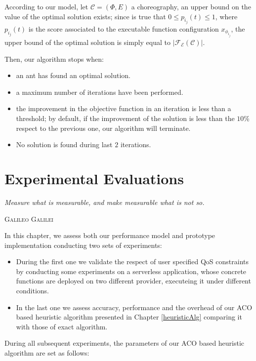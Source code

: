\documentclass[12pt,a4paper]{report}
\begin{document}
According to our model, let $\mathcal{C} = (\Phi,E)$ a choreography, an upper bound on the value of the optimal solution exists; since is true that $0 \leq p_{i_j}(t) \leq 1$, where $p_{i_j}(t)$ is the score associated to the executable function configuration $x_{\phi_{i_j}}$, the upper bound of the optimal solution is simply equal to $|\mathscr{F_E}(\mathcal{C})|$.

Then, our algorithm stops when:

\begin{itemize}
	\item an ant has found an optimal solution.
	\item a maximum number of iterations have been performed.
	\item the improvement in the objective function in an iteration is less than a threshold; by default, if the improvement of the solution is less than the $10\%$ respect to the previous one, our algorithm will terminate.
	\item No solution is found during last $2$ iterations.
\end{itemize}


\newpage

\chapter{Experimental Evaluations}\label{chapterExperimental}

\epigraph{\itshape Measure what is measurable, and make measurable what is not so.}{\textsc{Galileo Galilei}}

In this chapter, we assess both our performance model and prototype implementation conducting two sets of experiments:

\begin{itemize}
	\item During the first one we validate the respect of user specified QoS constraints by conducting some experiments on a serverless application, whose concrete functions are deployed on two different provider, executeing it under different conditions.

	\item In the last one we assess accuracy, performance and the overhead of our ACO based heuristic algorithm presented in Chapter \ref{heuristicAlg} comparing it with those of exact algorithm.
\end{itemize}

During all subsequent experiments, the parameters of our ACO based heuristic algorithm are set as follows:
\end{document}
